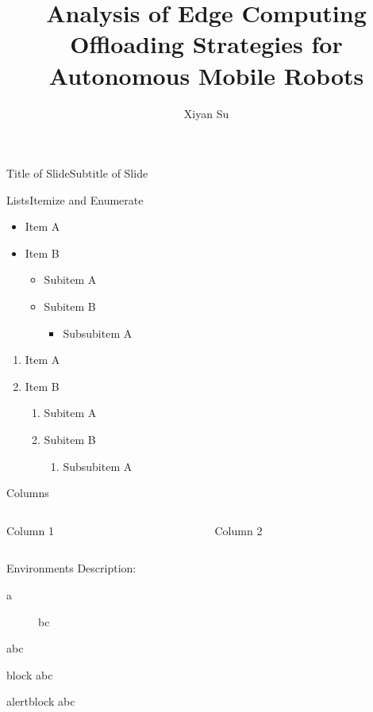 \documentclass[AIRbeamer%
               ,optEnglish%
               ,optBiber%
               ,optBibstyleAlphabetic%
               ,optBeamerWideFormat%
               ]{AIRlatex}%
\title[Edge Computing Offloading Strategies for AMRs]{Analysis of Edge Computing Offloading Strategies for Autonomous Mobile Robots}%
\author[Xiyan Su]{Xiyan Su}%
\date{\AIRutilsDate{1}{6}{2023}}%
\begin{document}
%
%
\AIRbeamerTitlePageStudentThesis%
%
\begin{frame}{Title of Slide}{Subtitle of Slide}%
    \blindtext%
\end{frame}%
%
%
%
\begin{frame}{Lists}{Itemize and Enumerate}%
    \begin{itemize}
        \item Item A
        \item Item B
        \begin{itemize}
            \item Subitem A
            \item Subitem B
            \begin{itemize}
                \item Subsubitem A
            \end{itemize}
        \end{itemize}
    \end{itemize}
    \begin{enumerate}
        \item Item A
        \item Item B
        \begin{enumerate}
            \item Subitem A
            \item Subitem B
            \begin{enumerate}
                \item Subsubitem A
            \end{enumerate}
        \end{enumerate}
    \end{enumerate}
\end{frame}%
%
\begin{frame}{Columns}%
    \begin{columns}[T,onlytextwidth]%
        \begin{column}[T]{0.48\textwidth}%
            Column 1%
        \end{column}%
        \begin{column}[T]{0.48\textwidth}%
            Column 2%
        \end{column}%
    \end{columns}%
\end{frame}%
%
\begin{frame}{Environments}%
    Description:%
    \begin{description}%
      \item [a] bc%
    \end{description}%
    \begin{theorem}%
      abc%
    \end{theorem}%
    \begin{block}{block}%
      abc%
    \end{block}%
    \begin{alertblock}{alertblock}%
      abc%
    \end{alertblock}%
\end{frame}%
\end{document}

